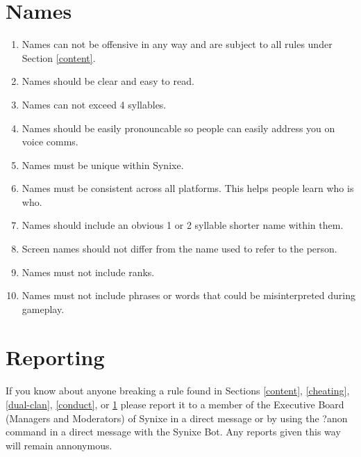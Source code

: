 \documentclass[10pt,a4paper]{article}
\begin{document}
\section{Names} \label{names}
\begin{enumerate}
	\item Names can not be offensive in any way and are subject to all rules under Section \ref{content}.
	\item Names should be clear and easy to read.
	\item Names can not exceed 4 syllables.
	\item Names should be easily pronouncable so people can easily address you on voice comms.
	\item Names must be unique within Synixe.
	\item Names must be consistent across all platforms. This helps people learn who is who.
	\item Names should include an obvious 1 or 2 syllable shorter name within them.
	\item Screen names should not differ from the name used to refer to the person.
	\item Names must not include ranks.
	\item Names must not include phrases or words that could be misinterpreted during gameplay.
\end{enumerate}
\section{Reporting}
\paragraph{}
If you know about anyone breaking a rule found in Sections \ref{content}, \ref{cheating}, \ref{dual-clan}, \ref{conduct}, or \ref{names} please report it to a member of the Executive Board (Managers and Moderators) of Synixe in a direct message or by using the ?anon command in a direct message with the Synixe Bot. Any reports given this way will remain annonymous.
\end{document}
